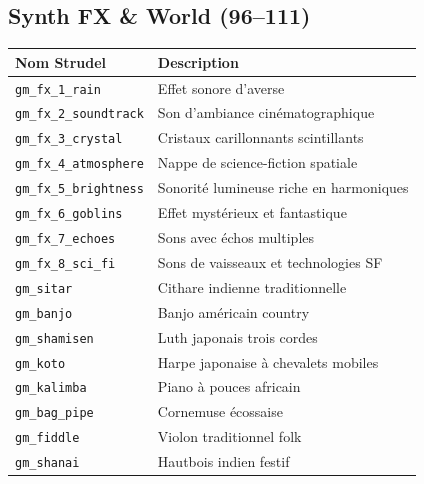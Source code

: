 \documentclass[a4paper,10pt]{article}
\begin{document}
\subsection{Synth FX \& World (96--111)}
\begin{tabularx}{\linewidth}{|l|X|}
\hline
\textbf{Nom Strudel} & \textbf{Description} \\
\hline
\texttt{gm\_fx\_1\_rain} & Effet sonore d'averse \\
\texttt{gm\_fx\_2\_soundtrack} & Son d'ambiance cinématographique \\
\texttt{gm\_fx\_3\_crystal} & Cristaux carillonnants scintillants \\
\texttt{gm\_fx\_4\_atmosphere} & Nappe de science-fiction spatiale \\
\texttt{gm\_fx\_5\_brightness} & Sonorité lumineuse riche en harmoniques \\
\texttt{gm\_fx\_6\_goblins} & Effet mystérieux et fantastique \\
\texttt{gm\_fx\_7\_echoes} & Sons avec échos multiples \\
\texttt{gm\_fx\_8\_sci\_fi} & Sons de vaisseaux et technologies SF \\
\texttt{gm\_sitar} & Cithare indienne traditionnelle \\
\texttt{gm\_banjo} & Banjo américain country \\
\texttt{gm\_shamisen} & Luth japonais trois cordes \\
\texttt{gm\_koto} & Harpe japonaise à chevalets mobiles \\
\texttt{gm\_kalimba} & Piano à pouces africain \\
\texttt{gm\_bag\_pipe} & Cornemuse écossaise \\
\texttt{gm\_fiddle} & Violon traditionnel folk \\
\texttt{gm\_shanai} & Hautbois indien festif \\
\hline
\end{tabularx}
\end{document}
